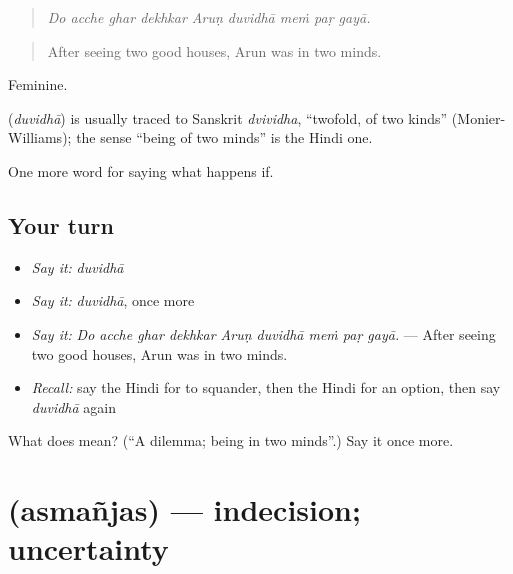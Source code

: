 \begin{quote}
        
\end{quote}

\begin{quote}
\emph{Do acche ghar dekhkar Aruṇ duvidhā meṁ paṛ gayā.}
\end{quote}

\begin{quote}
After seeing two good houses, Arun was in two minds.
\end{quote}

Feminine.

\begin{cousinweb}
\textbf{} (\emph{duvidhā}) is usually traced to Sanskrit \emph{dvividha}, \textquotedblleft{}twofold, of two kinds\textquotedblright{} (Monier-Williams); the sense \textquotedblleft{}being of two minds\textquotedblright{} is the Hindi one.
\end{cousinweb}

\begin{grammarlens}[title={What you've built}]
One more word for saying what happens if.
\end{grammarlens}

\subsection*{Your turn}
\begin{itemize}
\raggedright
  \item \emph{Say it:} \emph{duvidhā}
  \item \emph{Say it:} \emph{duvidhā}, once more
  \item \emph{Say it:} \emph{Do acche ghar dekhkar Aruṇ duvidhā meṁ paṛ gayā.} — After seeing two good houses, Arun was in two minds.
  \item \emph{Recall:} say the Hindi for to squander, then the Hindi for an option, then say \emph{duvidhā} again
\end{itemize}

\begin{tcolorbox}[breakable,colback=teal!4,colframe=teal!35!black,title={Before you move on}]
What does  mean? (\textquotedblleft{}A dilemma; being in two minds\textquotedblright{}.) Say it once more.
\end{tcolorbox}
\section[\texorpdfstring{\hi{असमंजस} (asmañjas)}{असमंजस (asmañjas)}]{ (asmañjas) — indecision; uncertainty}

